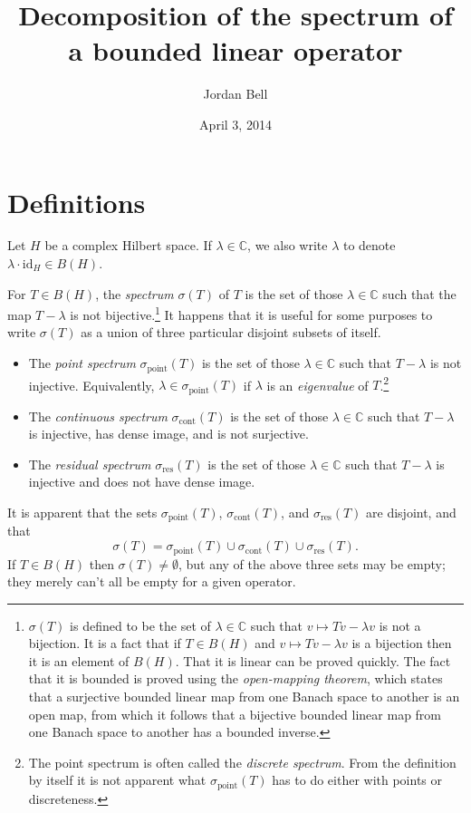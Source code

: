\documentclass{article}
\newcommand{\point}{\sigma_{\textrm{point}}}
\newcommand{\cont}{\sigma_{\textrm{cont}}}
\newcommand{\residual}{\sigma_{\textrm{res}}}
\newcommand{\id}{\textrm{id}}
\begin{document}
\title{Decomposition of the spectrum of a bounded linear operator}
\author{Jordan Bell}
\date{April 3, 2014}


\maketitle

\section{Definitions}
Let $H$ be a complex Hilbert space. If $\lambda \in \mathbb{C}$, we also write $\lambda$ to denote $\lambda \cdot \id_H \in B(H)$.

For $T \in B(H)$, the {\em spectrum} $\sigma(T)$ of $T$ is the set of those $\lambda \in \mathbb{C}$ such that the map
$T-\lambda$ is not bijective.\footnote{$\sigma(T)$
is defined to be the set of $\lambda \in \mathbb{C}$ such that $v \mapsto Tv-\lambda v$ is not a bijection. It is a fact that
if $T \in B(H)$ and $v \mapsto Tv- \lambda v$ is a bijection then it is an element of $B(H)$. That it is linear
can be proved quickly. The fact that it is bounded is proved using the {\em open-mapping theorem}, which states
that a surjective bounded linear map from one Banach space to another is an open map, from which it follows
that a bijective bounded linear map from one Banach space to another has a bounded inverse.}  It happens that it is  useful for some purposes to write $\sigma(T)$ as a union of three particular
 disjoint subsets of itself.
\begin{itemize}
\item The {\em point spectrum} $\point(T)$ is the set of those $\lambda \in \mathbb{C}$
such that $T-\lambda$ is not injective. Equivalently, $\lambda \in \point(T)$ if $\lambda$ is an {\em eigenvalue} of $T$.\footnote{The point spectrum is often called the {\em discrete spectrum}. From the definition by itself it is not apparent what $\point(T)$ has to do either with points or discreteness.}
\item The {\em continuous spectrum} $\cont(T)$ is the set of those $\lambda \in \mathbb{C}$ such that
$T-\lambda$ is injective, has dense image, and is not surjective.
\item The {\em residual spectrum} $\residual(T)$ is the set of those $\lambda \in \mathbb{C}$ such that
$T-\lambda$ is injective and does not have dense image.
\end{itemize}
It is apparent that the sets $\point(T)$, $\cont(T)$, and $\residual(T)$ are disjoint, and that
\[
\sigma(T)=\point(T) \cup \cont(T) \cup \residual(T).
\] 
If $T \in B(H)$ then $\sigma(T) \neq \emptyset$, but any  of the above three sets may
be empty; they merely can't all be empty for a given operator.
\end{document}
